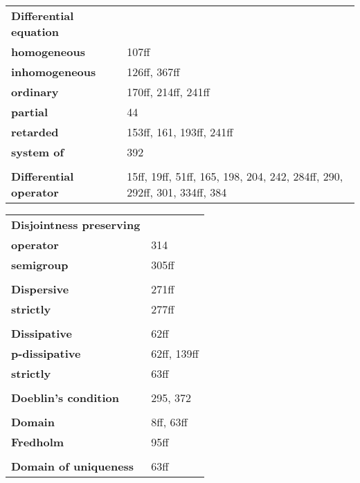 \documentclass[9pt]{scrartcl}
\begin{document}
\vspace{1cm}

\noindent
\begin{minipage}[t]{0.48\textwidth}
\begin{longtable}{>{\bfseries}p{4cm}p{3cm}}

\textbf{Differential equation} & \\
\quad homogeneous & 107ff \\
\quad inhomogeneous & 126ff, 367ff \\
\quad ordinary & 170ff, 214ff, 241ff \\
\quad partial & 44 \\
\quad retarded & 153ff, 161, 193ff, 241ff \\
\quad system of & 392 \\
\\
\textbf{Differential operator} & 15ff, 19ff, 51ff, 165, 198, 204, 242, 284ff, 290, 292ff, 301, 334ff, 384 \\

\end{longtable}
\end{minipage}
\hfill
\begin{minipage}[t]{0.48\textwidth}
\begin{longtable}{>{\bfseries}p{4cm}p{3cm}}

\textbf{Disjointness preserving} & \\
\quad operator & 314 \\
\quad semigroup & 305ff \\
\\
\textbf{Dispersive} & 271ff \\
\quad strictly & 277ff \\
\\
\textbf{Dissipative} & 62ff \\
\quad p-dissipative & 62ff, 139ff \\
\quad strictly & 63ff \\
\\
\textbf{Doeblin's condition} & 295, 372 \\
\\
\textbf{Domain} & 8ff, 63ff \\
\quad Fredholm & 95ff \\
\\
\textbf{Domain of uniqueness} & 63ff \\

\end{longtable}
\end{minipage}
\end{document}
